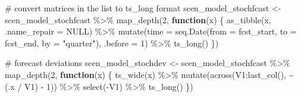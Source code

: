 \documentclass[
  letterpaper,
  DIV=11,
  numbers=noendperiod]{scrreport}
\newenvironment{Shaded}{\begin{snugshade}}{\end{snugshade}}
\newcommand{\AttributeTok}[1]{\textcolor[rgb]{0.40,0.45,0.13}{#1}}
\newcommand{\CommentTok}[1]{\textcolor[rgb]{0.37,0.37,0.37}{#1}}
\newcommand{\ConstantTok}[1]{\textcolor[rgb]{0.56,0.35,0.01}{#1}}
\newcommand{\ControlFlowTok}[1]{\textcolor[rgb]{0.00,0.23,0.31}{\textbf{#1}}}
\newcommand{\DecValTok}[1]{\textcolor[rgb]{0.68,0.00,0.00}{#1}}
\newcommand{\FunctionTok}[1]{\textcolor[rgb]{0.28,0.35,0.67}{#1}}
\newcommand{\NormalTok}[1]{\textcolor[rgb]{0.00,0.23,0.31}{#1}}
\newcommand{\OtherTok}[1]{\textcolor[rgb]{0.00,0.23,0.31}{#1}}
\newcommand{\SpecialCharTok}[1]{\textcolor[rgb]{0.37,0.37,0.37}{#1}}
\newcommand{\StringTok}[1]{\textcolor[rgb]{0.13,0.47,0.30}{#1}}
\begin{document}
\begin{Shaded}
\begin{Highlighting}[]
\CommentTok{\# convert matrices in the list to ts\_long format}
\NormalTok{scen\_model\_stochfcast }\OtherTok{\textless{}{-}}\NormalTok{ scen\_model\_stochfcast }\SpecialCharTok{\%\textgreater{}\%}
  \FunctionTok{map\_depth}\NormalTok{(}\DecValTok{2}\NormalTok{, }\ControlFlowTok{function}\NormalTok{(x) \{}
    \FunctionTok{as\_tibble}\NormalTok{(x, }\AttributeTok{.name\_repair =} \ConstantTok{NULL}\NormalTok{) }\SpecialCharTok{\%\textgreater{}\%}
      \FunctionTok{mutate}\NormalTok{(}\AttributeTok{time =} \FunctionTok{seq.Date}\NormalTok{(}\AttributeTok{from =}\NormalTok{ fcst\_start, }\AttributeTok{to =}\NormalTok{ fcst\_end, }\AttributeTok{by =} \StringTok{"quarter"}\NormalTok{), }\AttributeTok{.before =} \DecValTok{1}\NormalTok{) }\SpecialCharTok{\%\textgreater{}\%}
      \FunctionTok{ts\_long}\NormalTok{()}
\NormalTok{  \})}

\CommentTok{\# forecast deviations}
\NormalTok{scen\_model\_stochdev }\OtherTok{\textless{}{-}}\NormalTok{ scen\_model\_stochfcast }\SpecialCharTok{\%\textgreater{}\%}
  \FunctionTok{map\_depth}\NormalTok{(}\DecValTok{2}\NormalTok{, }\ControlFlowTok{function}\NormalTok{(x) \{}
    \FunctionTok{ts\_wide}\NormalTok{(x) }\SpecialCharTok{\%\textgreater{}\%}
      \FunctionTok{mutate}\NormalTok{(}\FunctionTok{across}\NormalTok{(V1}\SpecialCharTok{:}\FunctionTok{last\_col}\NormalTok{(), }\SpecialCharTok{\textasciitilde{}}\NormalTok{ (.x }\SpecialCharTok{/}\NormalTok{ V1) }\SpecialCharTok{{-}} \DecValTok{1}\NormalTok{)) }\SpecialCharTok{\%\textgreater{}\%}
      \FunctionTok{select}\NormalTok{(}\SpecialCharTok{{-}}\NormalTok{V1) }\SpecialCharTok{\%\textgreater{}\%}
      \FunctionTok{ts\_long}\NormalTok{()}
\NormalTok{  \})}
\end{Highlighting}
\end{Shaded}
\end{document}
